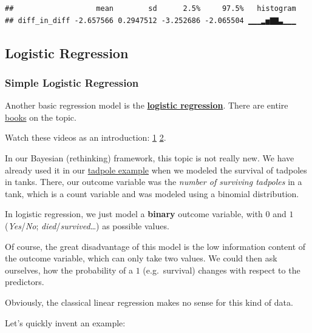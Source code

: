 \documentclass[
]{article}
\begin{document}
\begin{verbatim}
##                   mean        sd      2.5%     97.5%   histogram
## diff_in_diff -2.657566 0.2947512 -3.252686 -2.065504 ▁▁▁▂▅▇▇▃▁▁▁
\end{verbatim}

\subsection{Logistic Regression}\label{logistic_regression}

\subsubsection{Simple Logistic
Regression}\label{simple_logistic_regression}

Another basic regression model is the
\href{https://en.wikipedia.org/wiki/Logistic_regression}{\textbf{logistic
regression}}. There are entire
\href{https://onlinelibrary.wiley.com/doi/book/10.1002/9781118548387}{books}
on the topic.

Watch these videos as an introduction:
\href{https://www.youtube.com/watch?v=yIYKR4sgzI8&ab_channel=StatQuestwithJoshStarmer}{1}
\href{https://www.youtube.com/watch?v=Iju8l2qgaJU&t=330s&ab_channel=VeryNormal}{2}.

In our Bayesian (rethinking) framework, this topic is not really new. We
have already used it in our
\href{https://jdegenfellner.github.io/Script_QM3_ZHAW/further-regression-methods.html\#model13_1}{tadpole
example} when we modeled the survival of tadpoles in tanks. There, our
outcome variable was the \emph{number of surviving tadpoles} in a tank,
which is a count variable and was modeled using a binomial distribution.

In logistic regression, we just model a \textbf{binary} outcome
variable, with \(0\) and \(1\) (\emph{Yes}/\emph{No};
\emph{died}/\emph{survived}\ldots) as possible values.

Of course, the great disadvantage of this model is the low information
content of the outcome variable, which can only take two values. We
could then ask ourselves, how the probability of a \(1\) (e.g.~survival)
changes with respect to the predictors.

Obviously, the classical linear regression makes no sense for this kind
of data.

Let's quickly invent an example:
\end{document}
